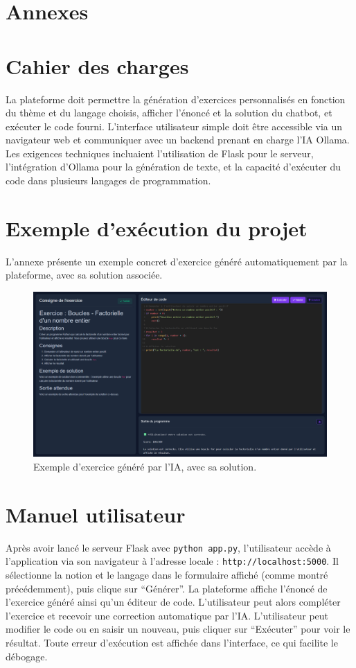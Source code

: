 \documentclass[a4paper, 12pt, twoside]{article}
\begin{document}
\newpage
\section{Annexes}
\appendix
\makeatletter
\def\@seccntformat#1{Annexe~\csname the#1\endcsname:\quad}
\makeatother

	\section{Cahier des charges}
La plateforme doit permettre la génération d'exercices personnalisés en fonction du thème et du langage choisis, afficher l'énoncé et la solution du chatbot, et exécuter le code fourni. L'interface utilisateur simple doit être accessible via un navigateur web et communiquer avec un backend prenant en charge l'IA Ollama. Les exigences techniques incluaient l'utilisation de Flask pour le serveur, l'intégration d'Ollama pour la génération de texte, et la capacité d'exécuter du code dans plusieurs langages de programmation.

	\section{Exemple d'exécution du projet}
L'annexe présente un exemple concret d'exercice généré automatiquement par la plateforme, avec sa solution associée. 

\begin{figure}[h!]
\centering
\includegraphics[width=1.3\textwidth]{exercice.png}
\caption{Exemple d'exercice généré par l'IA, avec sa solution.}
\label{fig:exercice}
\end{figure}

	\section{Manuel utilisateur}
Après avoir lancé le serveur Flask avec \texttt{python app.py}, l'utilisateur accède à l'application via son navigateur à l'adresse locale : \texttt{http://localhost:5000}. Il sélectionne la notion et le langage dans le formulaire affiché (comme montré précédemment), puis clique sur ``Générer''. La plateforme affiche l'énoncé de l'exercice généré ainsi qu'un éditeur de code. L'utilisateur peut alors compléter l'exercice et recevoir une correction automatique par l'IA. L'utilisateur peut modifier le code ou en saisir un nouveau, puis cliquer sur ``Exécuter'' pour voir le résultat. Toute erreur d'exécution est affichée dans l'interface, ce qui facilite le débogage.
\end{document}
